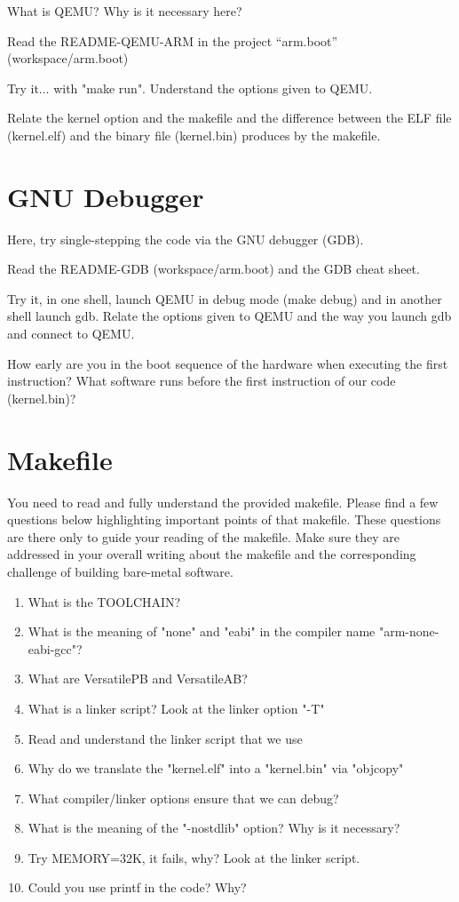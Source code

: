 \documentclass[10]{article}
\begin{document}
What is QEMU?
Why is it necessary here?

Read the README-QEMU-ARM in the project ``arm.boot'' (workspace/arm.boot)

Try it... with "make run". Understand the options given to QEMU.

Relate the kernel option and the makefile and the difference between the ELF file (kernel.elf) and the binary file (kernel.bin) produces by the makefile.

\section{GNU Debugger}

Here, try single-stepping the code via the GNU debugger (GDB).

Read the README-GDB (workspace/arm.boot) and the GDB cheat sheet.

Try it, in one shell, launch QEMU in debug mode (make debug)
and in another shell launch gdb. Relate the options given to QEMU
and the way you launch gdb and connect to QEMU.

How early are you in the boot sequence of the hardware when
executing the first instruction? What software runs before
the first instruction of our code (kernel.bin)?

\section{Makefile}

You need to read and fully understand the provided makefile.
Please find a few questions below highlighting important points
of that makefile. These questions are there only to guide your
reading of the makefile. Make sure they are addressed in your
overall writing about the makefile and the corresponding challenge
of building bare-metal software.

\begin{enumerate}
\item 
  What is the TOOLCHAIN?
\item
  What is the meaning of "none" and "eabi" in the compiler
  name "arm-none-eabi-gcc"?
\item
  What are VersatilePB and VersatileAB?
\item
  What is a linker script? Look at the linker option "-T"
\item
  Read and understand the linker script that we use
\item
  Why do we translate the "kernel.elf" into a "kernel.bin" via "objcopy"  
\item
  What compiler/linker options ensure that we can debug?
\item
  What is the meaning of the "-nostdlib" option? Why is it necessary?
\item
  Try MEMORY=32K, it fails, why? Look at the linker script.
\item
  Could you use printf in the code? Why?
\end{enumerate}
\end{document}
